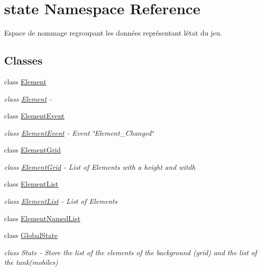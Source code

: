 \hypertarget{namespacestate}{}\section{state Namespace Reference}
\label{namespacestate}


Espace de nommage regroupant les données représentant l\textquotesingle{}état du jeu.  


\subsection*{Classes}
\begin{DoxyCompactItemize}
\item 
class \hyperlink{classstate_1_1_element}{Element}
\begin{DoxyCompactList}\small\item\em class \hyperlink{classstate_1_1_element}{Element} -\/ \end{DoxyCompactList}\item 
class \hyperlink{classstate_1_1_element_event}{Element\+Event}
\begin{DoxyCompactList}\small\item\em class \hyperlink{classstate_1_1_element_event}{Element\+Event} -\/ Event \char`\"{}\+Element\+\_\+\+Changed\char`\"{} \end{DoxyCompactList}\item 
class \hyperlink{classstate_1_1_element_grid}{Element\+Grid}
\begin{DoxyCompactList}\small\item\em class \hyperlink{classstate_1_1_element_grid}{Element\+Grid} -\/ List of Elements with a height and witdh \end{DoxyCompactList}\item 
class \hyperlink{classstate_1_1_element_list}{Element\+List}
\begin{DoxyCompactList}\small\item\em class \hyperlink{classstate_1_1_element_list}{Element\+List} -\/ List of Elements \end{DoxyCompactList}\item 
class \hyperlink{classstate_1_1_element_named_list}{Element\+Named\+List}
\item 
class \hyperlink{classstate_1_1_global_state}{Global\+State}
\begin{DoxyCompactList}\small\item\em class State -\/ Store the list of the elements of the background (grid) and the list of the tank(mobiles) \end{DoxyCompactList}\item 

\end{DoxyCompactItemize}
